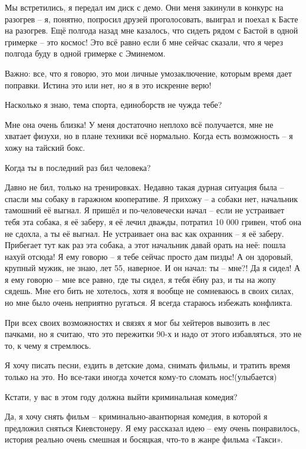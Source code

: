 Мы встретились, я передал им диск с демо. Они меня закинули в конкурс на
разогрев – я, понятно, попросил друзей проголосовать, выиграл и поехал к Басте
на разогрев. Ещё полгода назад мне казалось, что сидеть рядом с Бастой в одной
гримерке – это космос! Это всё равно если б мне сейчас сказали, что я через
полгода буду в одной гримерке с Эминемом.

Важно: все, что я говорю, это мои личные умозаключение, которым время дает
поправки. Истина это или нет, но я в это искренне верю!

Насколько я знаю, тема спорта, единоборств не чужда тебе?

Мне она очень близка! У меня  достаточно неплохо всё получается, мне не хватает
физухи, но в плане техники всё нормально. Когда есть возможность – я хожу на
тайский бокс.

Когда ты в последний раз бил человека?

Давно не бил, только на тренировках. Недавно такая дурная ситуация была –
спасли мы собаку в гаражном кооперативе. Я прихожу – а собаки нет, начальник
тамошний её выгнал. Я пришёл и по-человечески начал – если не устраивает тебя
эта собака, я её заберу, я её лечил дважды, потратил 10 000 гривен, чтоб она не
сдохла, а ты её выгнал. Не устраивает она вас как охранник – я её заберу.
Прибегает тут как раз эта собака, а этот начальник давай орать на неё: пошла
нахуй отсюда! Я ему говорю – я тебе сейчас просто дам пизды! А он здоровый,
крупный мужик, не знаю, лет 55, наверное. И он начал: ты – мне?! Да я сидел! А
я ему говорю – мне все равно, где ты сидел, я тебя ёбну раз, и ты на жопу
сядешь. Мне его бить не хотелось, хотя я вообще не сомневаюсь в своих силах, но
мне было очень неприятно ругаться. Я всегда стараюсь избежать конфликта.

При всех своих возможностях и связях я мог бы хейтеров вывозить в лес пачками,
но я считаю, что это пережитки 90-х и надо от этого избавляться, это не то, к
чему я стремлюсь.

Я хочу писать песни, ездить в детские дома, снимать фильмы, и тратить время
только на это. Но все-таки иногда хочется кому-то сломать нос!(улыбается)

Кстати, у вас в этом году должна выйти криминальная комедия?

Да, я хочу снять фильм – криминально-авантюрная комедия, в которой я предложил
сняться Киевстонеру. Я ему рассказал идею – ему очень понравилось, история
реально очень смешная и босяцкая, что-то в жанре фильма «Такси».

